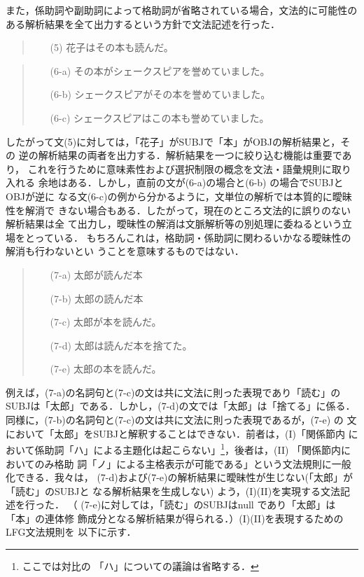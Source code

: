 また，係助詞や副助詞によって格助詞が省略されている場合，文法的に可能性の
ある解析結果を全て出力するという方針で文法記述を行った．
\begin{quote}
\begin{itemize}
\item[(5)] 花子はその本も読んだ。
\end{itemize}
\end{quote}
\begin{quote}
\begin{itemize}
\item[(6-a)]その本がシェークスピアを誉めていました。
\item[(6-b)]シェークスピアがその本を誉めていました。
\item[(6-c)]シェークスピアはこの本も誉めていました。
\end{itemize}
\end{quote}
したがって文(5)に対しては，「花子」がSUBJで「本」がOBJの解析結果と，その
逆の解析結果の両者を出力する．解析結果を一つに絞り込む機能は重要であり，
これを行うために意味素性および選択制限の概念を文法・語彙規則に取り入れる
余地はある．しかし，直前の文が(6-a)の場合と(6-b) の場合でSUBJとOBJが逆に
なる文(6-c)の例から分かるように，文単位の解析では本質的に曖昧性を解消で
きない場合もある．したがって，現在のところ文法的に誤りのない解析結果は全
て出力し，曖昧性の解消は文脈解析等の別処理に委ねるという立場をとっている．
もちろんこれは，格助詞・係助詞に関わるいかなる曖昧性の解消も行わないとい
うことを意味するものではない．
\begin{quote}
\begin{itemize}
\item[(7-a)]太郎が読んだ本
\item[(7-b)]太郎の読んだ本
\item[(7-c)]太郎が本を読んだ。
\item[(7-d)]太郎は読んだ本を捨てた。
\item[(7-e)]太郎の本を読んだ。
\end{itemize}
\end{quote}
例えば，(7-a)の名詞句と(7-c)の文は共に文法に則った表現であり「読む」の
SUBJは「太郎」である．しかし，(7-d)の文では「太郎」は「捨てる」に係る．
同様に，(7-b)の名詞句と(7-c)の文は共に文法に則った表現であるが，(7-e) の
文において「太郎」をSUBJと解釈することはできない．前者は，(I)「関係節内
において係助詞「ハ」による主題化は起こらない」\footnote{ここでは対比の
「ハ」についての議論は省略する．}，後者は，(II) 「関係節内においてのみ格助
詞「ノ」による主格表示が可能である」という文法規則に一般化できる．我々は，
(7-d)および(7-e)の解析結果に曖昧性が生じない(「太郎」が「読む」のSUBJと
なる解析結果を生成しない) よう，(I)(II)を実現する文法記述を行った．
（ (7-e)に対しては，「読む」のSUBJはnull であり「太郎」は「本」の連体修
飾成分となる解析結果が得られる．）(I)(II)を表現するためのLFG文法規則を
以下に示す．
\vspace{3mm}

